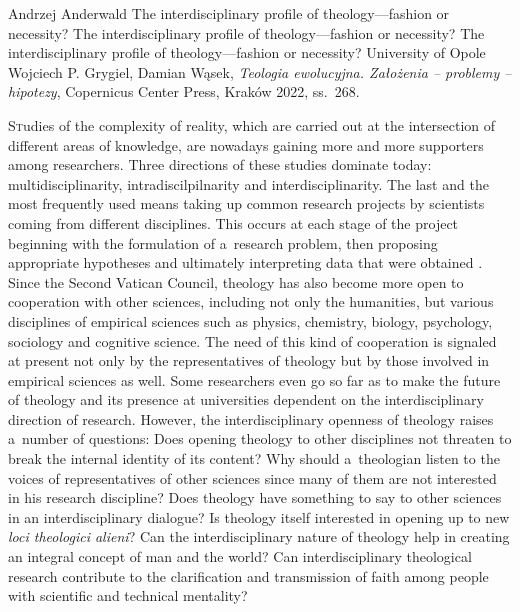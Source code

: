 \begin{newrevengenv}{Andrzej Anderwald}
	{The interdisciplinary profile of theology---fashion or necessity?}
	{The interdisciplinary profile of theology---fashion or necessity?}
	{The interdisciplinary profile of theology---fashion or necessity?}
	{University of Opole}
	{Wojciech P. Grygiel, Damian Wąsek, \textit{Teologia ewolucyjna. Założenia -- problemy -- hipotezy}, Copernicus Center Press, Kraków 2022, ss.~268.}









\lettrine[loversize=0.13,lines=2,lraise=-0.03,nindent=0em,findent=0.2pt]%
{S}tudies of the complexity of reality, which are carried out at the intersection of different areas of knowledge, are nowadays gaining more and more supporters among researchers. Three directions of these studies dominate today: multidisciplinarity, intradiscilpilnarity and interdisciplinarity. The last and the most frequently used means taking up common research projects by scientists coming from different disciplines. This occurs at each stage of the project beginning with the formulation of a~research problem, then proposing appropriate hypotheses and ultimately interpreting data that were obtained 
\parencite[][]{kasper_interdisziplinaritat_1996}. %
 Since the Second Vatican Council, theology has also become more open to cooperation with other sciences, including not only the humanities, but various disciplines of empirical sciences such as physics, chemistry, biology, psychology, sociology and cognitive science. The need of this kind of cooperation is signaled at present not only by the representatives of theology but by those involved in empirical sciences as well. Some researchers even go so far as to make the future of theology and its presence at universities dependent on the interdisciplinary direction of research. However, the interdisciplinary openness of theology raises a~number of questions: Does opening theology to other disciplines not threaten to break the internal identity of its content? Why should a~theologian listen to the voices of representatives of other sciences since many of them are not interested in his research discipline? Does theology have something to say to other sciences in an interdisciplinary dialogue? Is theology itself interested in opening up to new \textit{loci theologici alieni}? Can the interdisciplinary nature of theology help in creating an integral concept of man and the world? Can interdisciplinary theological research contribute to the clarification and transmission of faith among people with scientific and technical mentality?




\end{newrevengenv}
